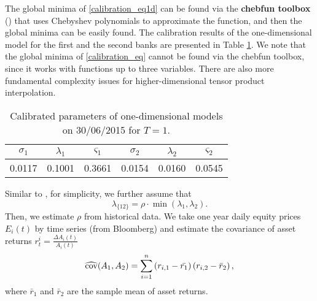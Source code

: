 The global minima of \eqref{calibration_eq1d} can be found via the {\bf{chebfun toolbox}} (\cite{Trefethen}) that uses Chebyshev polynomials to approximate the function, and then the global minima can be easily found. The calibration results of the one-dimensional model for the first and the second banks are presented in Table \ref{table:params_1d}. We note that the global minima of \eqref{calibration_eq} cannot be found via the chebfun toolbox, since it works with functions up to three variables. There are also more fundamental complexity issues for higher-dimensional tensor product interpolation.

\begin{table}[H]
	\begin{center}
		\begin{tabular}{| c | c | c | c | c | c |}
			\hline
			$\sigma_1$ & $\lambda_1$ & $\varsigma_1$ & $\sigma_2$ & $\lambda_2$ & $\varsigma_2$  \\ 
			\hline
			 0.0117&  0.1001& 0.3661& 0.0154 & 0.0160 & 0.0545\\
			\hline
		\end{tabular}
		\caption{Calibrated parameters of one-dimensional models on 30/06/2015 for $T = 1$.}
		\label{table:params_1d}	
	\end{center}
\end{table}

Similar to \cite{LiptonSepp}, for simplicity, we further assume that 
\begin{equation}
	\lambda_{\{12\}} = \rho \cdot \min(\lambda_1, \lambda_2).
	\label{lambda_assumption}
\end{equation}
 Then, we estimate $\rho$ from historical data. We take one year daily  equity prices $E_i(t)$ by time series (from Bloomberg) and estimate the covariance of asset returns $r_t^i = \frac{\Delta A_i(t)}{A_i(t)}$
\begin{equation}
	\widehat{\operatorname{cov}}(A_1, A_2) = \sum \limits_{i = 1}^n \left(r_{i, 1} - \bar{r_1} \right)\left(r_{i, 2} - \bar{r}_2  \right),
	\label{cov_est}
\end{equation}
where $\bar{r}_1$ and $\bar{r}_2$ are the sample mean of asset returns.


